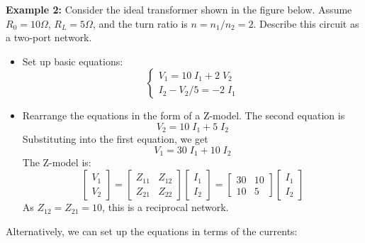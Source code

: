 \begin{itemize}
{\bf Example 2:} Consider the ideal transformer shown in the figure below. 
Assume $R_0=10\Omega$, $R_L=5\Omega$, and the turn ratio is $n=n_1/n_2=2$. 
Describe this circuit as a two-port network.


\begin{itemize}
\item Set up basic equations:
\[	\left\{ \begin{array}{l} 
	V_1=10\;I_1+2\;V_2 \\ I_2-V_2/5=-2\;I_1 \end{array} \right. \]
\item Rearrange the equations in the form of a Z-model. The second equation is
\[	V_2=10\;I_1+5\;I_2	\]
Substituting into the first equation, we get
\[	V_1=30\;I_1+10\;I_2	\]
The Z-model is:
\[	\left[ \begin{array}{l} V_1 \\ V_2 \end{array} \right]=
	\left[ \begin{array}{rr} Z_{11} & Z_{12} \\ Z_{21} & Z_{22} \end{array} \right]
	\left[ \begin{array}{l} I_1 \\ I_2 \end{array} \right]
=	\left[ \begin{array}{rr} 30 & 10 \\ 10 & 5 \end{array} \right]
	\left[ \begin{array}{l} I_1 \\ I_2 \end{array} \right]
\]
As $Z_{12}=Z_{21}=10$, this is a reciprocal network.
\end{itemize}
Alternatively, we can set up the equations in terms of the currents:


\end{itemize}
